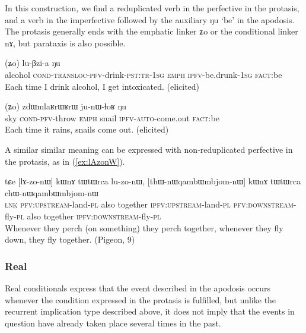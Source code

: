 \documentclass[oldfontcommands,oneside,a4paper,11pt]{article}
\newcommand{\ipa}[1]{{\phon \mbox{#1}}} %
\newcommand{\refb}[1]{(\ref{#1})}
\begin{document}
In this construction, we find a reduplicated verb in the perfective  in the protasis, and a verb in the imperfective followed by the auxiliary \ipa{ŋu} `be'   in the apodosis. The protasis generally ends with the emphatic linker \ipa{ʑo} or the conditional linker \ipa{nɤ}, but parataxis is also possible.

     \begin{exe}
   \ex \label{ex:CWCkAtshita}
   \gll
[\ipa{cʰa}   	\textbf{\ipa{ɕɯ-ɕ-kɤ-tsʰi-t-a}}]   	(\ipa{ʑo})   	\ipa{lu-βzi-a}   	\ipa{ŋu}   \\
alcohol \textsc{cond-transloc-pfv}-drink-\textsc{pst:tr-1sg} \textsc{emph} \textsc{ipfv}-be.drunk-\textsc{1sg} \textsc{fact}:be\\
\glt Each time I drink alcohol, I get intoxicated. (elicited)
\end{exe}

     \begin{exe}
   \ex \label{ex:tWmW.kWkAlAt}
   \gll
[\ipa{tɯmɯ}   \textbf{	\ipa{kɯ-kɤ-lɤt}}]   	(\ipa{ʑo})   	\ipa{zdɯmlaʁrɯʁrɯ}   	\ipa{ju-nɯ-ɬoʁ}   	\ipa{ŋu}   \\
sky \textsc{cond-pfv}-throw \textsc{emph} snail \textsc{ipfv-auto}-come.out \textsc{fact}:be\\
\glt Each time it rains,  snails come out. (elicited)
\end{exe}

A similar similar meaning can be expressed with non-reduplicated perfective in the protasis, as in \refb{ex:lAzonW}.

     \begin{exe}
\ex \label{ex:lAzonW}
\gll
\ipa{tɕe} 	[\ipa{lɤ-zo-nɯ}] 	\ipa{kɯnɤ} 	\ipa{tɯtɯrca} 	\ipa{lu-zo-nɯ,} 	[\ipa{thɯ-nɯqambɯmbjom-nɯ}] 	\ipa{kɯnɤ} 	\ipa{tɯtɯrca} 	\ipa{chɯ-nɯqambɯmbjom-nɯ}  \\
\textsc{lnk} \textsc{pfv:upstream}-land-\textsc{pl} also together \textsc{ipfv:upstream}-land-\textsc{pl} \textsc{pfv:downstream}-fly-\textsc{pl} also together \textsc{ipfv:downstream}-fly-\textsc{pl}  \\
\glt Whenever they perch (on something) they perch together, whenever they fly down, they fly together. (Pigeon, 9)
\end{exe}

\subsubsection{Real} \label{sec:real.conditional}
Real conditionals express that the event described in the apodosis occurs whenever the condition expressed in the protasis is fulfilled, but unlike the recurrent implication type described above, it does not imply that the events in question have already taken place several times in the past.
\end{document}
